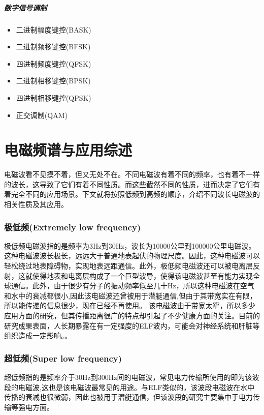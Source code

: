 \documentclass[UTF8]{article}
\begin{document}
\begin{CJK}{UTF8}{gkai}
\subsubsection{数字信号调制}
\begin{itemize}
\item  二进制幅度键控(BASK)
\item  二进制频移键控(BFSK)
\item  四进制频度键控(QFSK)
\item  二进制相移键控(BPSK)
\item  四进制相移键控(QPSK)
\item  正交调制(QAM)
\end{itemize}
\clearpage
\part{电磁频谱与应用综述}
电磁波看不见摸不着，但又无处不在。不同电磁波有着不同的频率，也有着不一样的波长，这导致了它们有着不同性质。而这些截然不同的性质，进而决定了它们有着完全不同的应用场景。下文就将按照低频到高频的顺序，介绍不同波长电磁波的相关性质及其应用。
\setcounter{section}{0}
\section{极低频(Extremely low frequency)}
极低频电磁波指的是频率为3Hz到30Hz，波长为10000公里到100000公里电磁波。这种电磁波波长极长，远远大于普通地表起伏的物理尺度。因此，这种电磁波可以轻松绕过地表障碍物，实现地表远距通信。此外，极低频电磁波还可以被电离层反射，这就使得地表和电离层构成了一个巨型波导，使得该电磁波甚至有能力实现全球通信。此外，由于很少有分子的振动频率低至几十Hz，所以这种电磁波在空气和水中的衰减都很小\cite{Jursa1985Handbook},因此该电磁波还曾被用于潜艇通信\cite{Barr2000ELF},但由于其带宽实在有限，所以能传递的信息很少，现在已经不再使用。
该电磁波由于带宽太窄，所以多少应用方面的研究，但其传播距离很广的特点却引起了不少健康方面的关注。目前的研究成果表面，人长期暴露在有一定强度的ELF波内，可能会对神经系统和肝脏等组织造成一定影响。\cite{赵龙宇2012工作场所极低频电磁辐射对作业人员健康状况影响的调查分析,刘欣2013极低频电磁场暴露对从业人员肝脏功能的影响}。
\section{超低频(Super low frequency)}
超低频指的是频率介于30Hz到300Hz间的电磁波，常见电力传输所使用的即为该波段的电磁波,这也是该电磁波最常见的用途。与ELF类似的，该波段电磁波在水中传播的衰减也很微弱，因此也被用于潜艇通信，但该波段的研究主要集中于电力传输等强电方面。

\end{CJK}
\end{document}
